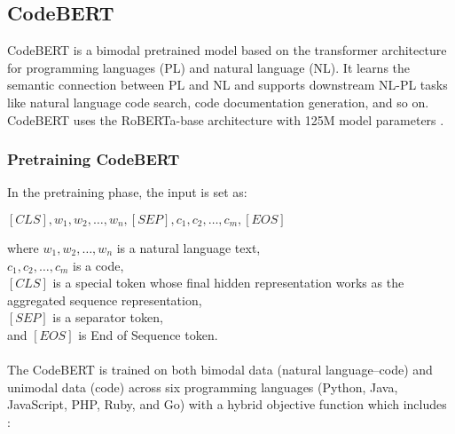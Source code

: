 \subsection{CodeBERT}
CodeBERT is a bimodal pretrained model based on the transformer architecture for programming languages (PL) and natural language (NL). It learns the semantic connection between PL and NL and supports downstream NL-PL tasks like natural language code search, code documentation generation, and so on. CodeBERT uses the RoBERTa-base architecture with 125M model parameters \cite{feng2020codebert, AnalyticsIndiaMagazine2020}.

\subsubsection{Pretraining CodeBERT}
In the pretraining phase, the input is set as:
\begin{center}
$[CLS], w_1, w_2, \ldots, w_n, [SEP], c_1, c_2, \ldots, c_m, [EOS]$
\end{center}
where $w_1, w_2, \ldots, w_n$ is a natural language text,\\
\hspace*{10mm} $c_1, c_2, \ldots, c_m$ is a code,\\
\hspace*{10mm} $[CLS]$ is a special token whose final hidden representation works as the aggregated \hspace*{10mm} sequence representation,\\
\hspace*{10mm} $[SEP]$ is a separator token,\\
\hspace*{10mm} and $[EOS]$ is End of Sequence token.\\
\\
The CodeBERT is trained on both bimodal data (natural language–code) and unimodal data (code) across six programming languages (Python, Java, JavaScript, PHP, Ruby, and Go) with a hybrid objective function which includes \cite{feng2020codebert}:

